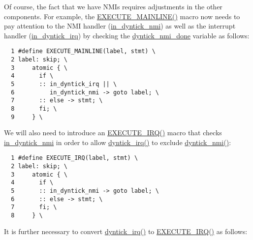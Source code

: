 Of course, the fact that we have NMIs requires adjustments in
the other components.
For example, the \url{EXECUTE_MAINLINE()} macro now needs to
pay attention to the NMI handler (\url{in_dyntick_nmi}) as well
as the interrupt handler (\url{in_dyntick_irq}) by checking
the \url{dyntick_nmi_done} variable as follows:

{ \scriptsize
\begin{verbatim}
  1 #define EXECUTE_MAINLINE(label, stmt) \
  2 label: skip; \
  3     atomic { \
  4       if \
  5       :: in_dyntick_irq || \
  6          in_dyntick_nmi -> goto label; \
  7       :: else -> stmt; \
  8       fi; \
  9     } \
\end{verbatim}
}

We will also need to introduce an \url{EXECUTE_IRQ()}
macro that checks \url{in_dyntick_nmi} in order to allow
\url{dyntick_irq()} to exclude \url{dyntick_nmi()}:

{ \scriptsize
\begin{verbatim}
  1 #define EXECUTE_IRQ(label, stmt) \
  2 label: skip; \
  3     atomic { \
  4       if \
  5       :: in_dyntick_nmi -> goto label; \
  6       :: else -> stmt; \
  7       fi; \
  8     } \
\end{verbatim}
}

It is further necessary to convert \url{dyntick_irq()}
to \url{EXECUTE_IRQ()} as follows:

